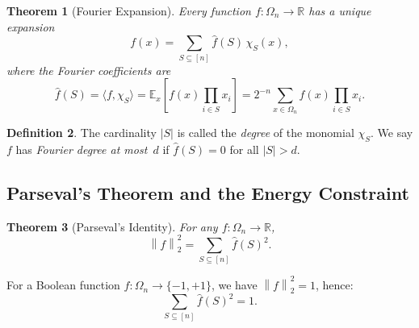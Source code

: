 \documentclass[12pt,a4paper]{article}
\theoremstyle{plain}
\newtheorem{theorem}{Theorem}[section]
\theoremstyle{definition}
\newtheorem{definition}[theorem]{Definition}
\theoremstyle{remark}
\newcommand{\R}{\mathbb{R}}
\newcommand{\E}{\mathbb{E}}
\newcommand{\pmone}{\{-1,+1\}}
\newcommand{\fhat}{\widehat{f}}
\newcommand{\ip}[2]{\langle #1, #2 \rangle}
\newcommand{\norm}[1]{\left\| #1 \right\|}
\begin{document}
\begin{theorem}[Fourier Expansion]\label{thm:fourier-expansion}
Every function $f \colon \Omega_n \to \R$ has a unique expansion
\begin{equation}\label{eq:fourier-expansion}
    f(x) = \sum_{S \subseteq [n]} \fhat(S)\, \chi_S(x),
\end{equation}
where the \emph{Fourier coefficients} are
\begin{equation}\label{eq:fourier-coeff}
    \fhat(S) = \ip{f}{\chi_S} = \E_x\!\left[f(x) \prod_{i \in S} x_i\right] = 2^{-n} \sum_{x \in \Omega_n} f(x) \prod_{i \in S} x_i.
\end{equation}
\end{theorem}

\begin{definition}
The cardinality $|S|$ is called the \emph{degree} of the monomial $\chi_S$. We say $f$ has \emph{Fourier degree at most~$d$} if $\fhat(S) = 0$ for all $|S| > d$.
\end{definition}


\subsection{Parseval's Theorem and the Energy Constraint}\label{sec:parseval}

\begin{theorem}[Parseval's Identity]\label{thm:parseval}
For any $f \colon \Omega_n \to \R$,
\begin{equation}\label{eq:parseval}
    \norm{f}_2^2 = \sum_{S \subseteq [n]} \fhat(S)^2.
\end{equation}
\end{theorem}

For a Boolean function $f \colon \Omega_n \to \pmone$, we have $\norm{f}_2^2 = 1$, hence:
\begin{equation}\label{eq:boolean-parseval}
    \sum_{S \subseteq [n]} \fhat(S)^2 = 1.
\end{equation}
\end{document}
